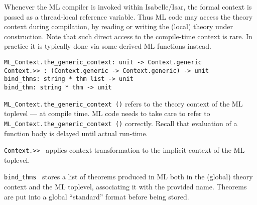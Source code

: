 \begin{isabellebody}
\endisatagML
{\isafoldML}%
%
\isadelimML
\isanewline
%
\endisadelimML
{}\isamarkupfalse%
%
\isamarkuptrue%
%
\begin{isamarkuptext}%
Whenever the ML compiler is invoked within Isabelle/Isar, the
  formal context is passed as a thread-local reference variable.  Thus
  ML code may access the theory context during compilation, by reading
  or writing the (local) theory under construction.  Note that such
  direct access to the compile-time context is rare.  In practice it
  is typically done via some derived ML functions instead.%
\end{isamarkuptext}%
\isamarkuptrue%
%
\isadelimmlref
%
\endisadelimmlref
%
\isatagmlref
%
\begin{isamarkuptext}%
\begin{mldecls}
  \verb|ML_Context.the_generic_context: unit -> Context.generic| \\
  \verb|Context.>> : (Context.generic -> Context.generic) -> unit| \\
  \verb|bind_thms: string * thm list -> unit| \\
  \verb|bind_thm: string * thm -> unit| \\
  \end{mldecls}

  \begin{description}

  \item \verb|ML_Context.the_generic_context ()| refers to the theory
  context of the ML toplevel --- at compile time.  ML code needs to
  take care to refer to \verb|ML_Context.the_generic_context ()|
  correctly.  Recall that evaluation of a function body is delayed
  until actual run-time.

  \item \verb|Context.>>|~ applies context transformation
   to the implicit context of the ML toplevel.

  \item \verb|bind_thms|~ stores a list of
  theorems produced in ML both in the (global) theory context and the
  ML toplevel, associating it with the provided name.  Theorems are
  put into a global ``standard'' format before being stored.


\end{description}
\end{isamarkuptext}
\end{isabellebody}
